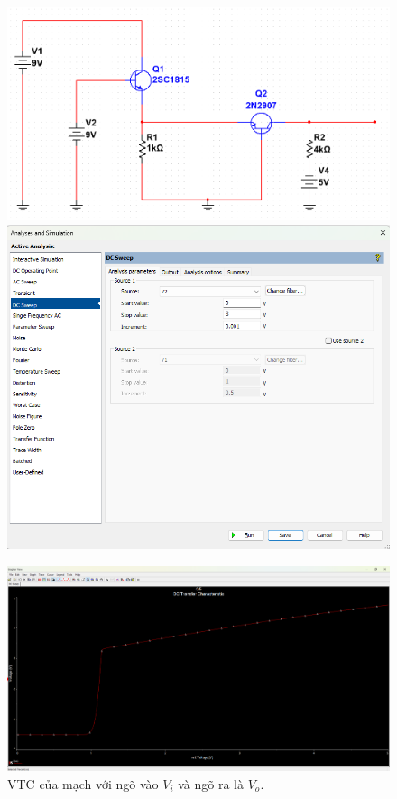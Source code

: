 \begin{figure}[H]
	\centering
	\begin{minipage}{.5\linewidth}
		\includegraphics[width=.8\linewidth]{./my-chapters/my-images/Question5/a_mach.png}
	\end{minipage}
	\begin{minipage}{.4\linewidth}
		\includegraphics[width=.8\linewidth]{./my-chapters/my-images/Question5/a_dc_sweep.png}
	\end{minipage}
\end{figure}

\begin{figure}[H]
	\centering
	\includegraphics[width=.9\linewidth]{./my-chapters/my-images/Question5/a_VTC.png}
	\caption{VTC của mạch với ngõ vào $V_{i}$ và ngõ ra là $V_{o}$.}
\end{figure}

